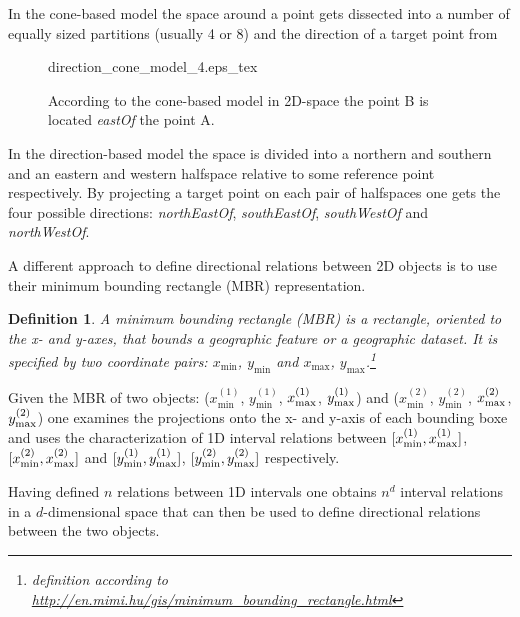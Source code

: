 \documentclass[paper=a4, fontsize=11pt]{scrartcl} %
\numberwithin{equation}{section} %
\numberwithin{figure}{section} %
\numberwithin{table}{section} %
\newtheorem{mydef}{Definition}
\begin{document}
In the cone-based model the space around a point gets dissected into a number of equally sized partitions (usually 4 or 8) and the direction of a target point from 

\begin{figure}
  \centering
  \def\svgwidth{15em}
  {direction_cone_model_4.eps_tex}
  \caption{According to the cone-based model in 2D-space the point B is located \emph{eastOf} the point A.}
\label{fig:direction_cone_model_4}
\end{figure}

In the direction-based model the space is divided into a northern and southern and an eastern and western halfspace relative to some reference point respectively. By projecting a target point on each pair of halfspaces one gets the four possible directions: \emph{northEastOf}, \emph{southEastOf}, \emph{southWestOf} and \emph{northWestOf}. 

A different approach to define directional relations between 2D objects is to use their minimum bounding rectangle (MBR) representation.

\begin{mydef}
  A minimum bounding rectangle (MBR) is a rectangle, oriented to the x- and y-axes, that bounds a geographic feature or a geographic dataset. It is specified by two coordinate pairs: $x_{\mathrm{min}}$, $y_{\mathrm{min}}$ and $x_{\mathrm{max}}$, $y_{\mathrm{max}}$.\footnote{definition according to \url{http://en.mimi.hu/gis/minimum_bounding_rectangle.html}}
\end{mydef}

Given the MBR of two objects: ($x^{(1)}_{\mathrm{min}}$, $y^{(1)}_{\mathrm{min}}$, $x^{(1)}_{\vphantom{\mathrm{i}}\mathrm{max}}$, $y^{(1)}_{\vphantom{\mathrm{i}}\mathrm{max}}$) and ($x^{(2)}_{\mathrm{min}}$, $y^{(2)}_{\mathrm{min}}$, $x^{(2)}_{\vphantom{\mathrm{i}}\mathrm{max}}$, $y^{(2)}_{\vphantom{\mathrm{i}}\mathrm{max}}$) one examines the projections onto the x- and y-axis of each bounding boxe and uses the characterization of 1D interval relations between $[x^{(1)}_{\mathrm{min}}, x^{(1)}_{\vphantom{\mathrm{i}}\mathrm{max}}]$, $[x^{(2)}_{\mathrm{min}}, x^{(2)}_{\vphantom{\mathrm{i}}\mathrm{max}}]$ and $[y^{(1)}_{\mathrm{min}}, y^{(1)}_{\vphantom{\mathrm{i}}\mathrm{max}}]$, $[y^{(2)}_{\mathrm{min}}, y^{(2)}_{\vphantom{\mathrm{i}}\mathrm{max}}]$ respectively. 
 
Having defined $n$ relations between 1D intervals one obtains $n^d$ interval relations in a $d$-dimensional space that can then be used to define directional relations between the two objects. 
\end{document}
